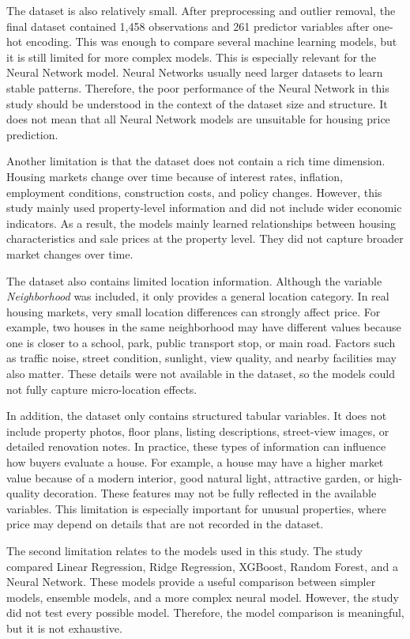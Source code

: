 \documentclass[12pt,a4paper,oneside,openany]{book}
\begin{document}
The dataset is also relatively small. After preprocessing and outlier removal, the final dataset contained 1,458 observations and 261 predictor variables after one-hot encoding. This was enough to compare several machine learning models, but it is still limited for more complex models. This is especially relevant for the Neural Network model. Neural Networks usually need larger datasets to learn stable patterns. Therefore, the poor performance of the Neural Network in this study should be understood in the context of the dataset size and structure. It does not mean that all Neural Network models are unsuitable for housing price prediction.

Another limitation is that the dataset does not contain a rich time dimension. Housing markets change over time because of interest rates, inflation, employment conditions, construction costs, and policy changes. However, this study mainly used property-level information and did not include wider economic indicators. As a result, the models mainly learned relationships between housing characteristics and sale prices at the property level. They did not capture broader market changes over time.

The dataset also contains limited location information. Although the variable \textit{Neighborhood} was included, it only provides a general location category. In real housing markets, very small location differences can strongly affect price. For example, two houses in the same neighborhood may have different values because one is closer to a school, park, public transport stop, or main road. Factors such as traffic noise, street condition, sunlight, view quality, and nearby facilities may also matter. These details were not available in the dataset, so the models could not fully capture micro-location effects.

In addition, the dataset only contains structured tabular variables. It does not include property photos, floor plans, listing descriptions, street-view images, or detailed renovation notes. In practice, these types of information can influence how buyers evaluate a house. For example, a house may have a higher market value because of a modern interior, good natural light, attractive garden, or high-quality decoration. These features may not be fully reflected in the available variables. This limitation is especially important for unusual properties, where price may depend on details that are not recorded in the dataset.

The second limitation relates to the models used in this study. The study compared Linear Regression, Ridge Regression, XGBoost, Random Forest, and a Neural Network. These models provide a useful comparison between simpler models, ensemble models, and a more complex neural model. However, the study did not test every possible model. Therefore, the model comparison is meaningful, but it is not exhaustive.
\end{document}
